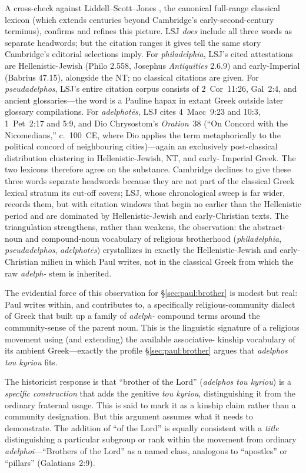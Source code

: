 \documentclass[12pt,oneside]{article}
\newcommand{\grk}[1]{\textit{#1}}   %
\begin{document}
A cross-check against Liddell--Scott--Jones \citep{LSJ1940}, the
canonical full-range classical lexicon (which extends centuries
beyond Cambridge's early-second-century terminus), confirms and
refines this picture.  LSJ \textit{does} include all three words
as separate headwords; but the citation ranges it gives tell the
same story Cambridge's editorial selections imply.  For
\grk{philadelphia}, LSJ's cited attestations are Hellenistic-Jewish
(Philo 2.558, Josephus \textit{Antiquities} 2.6.9) and early-Imperial
(Babrius 47.15), alongside the NT; no classical citations are
given.  For \grk{pseudadelphos}, LSJ's entire citation corpus
consists of 2~Cor~11:26, Gal~2:4, and ancient glossaries---the
word is a Pauline hapax in extant Greek outside later glossary
compilations.  For \grk{adelphot\=es}, LSJ cites 4~Macc~9:23 and
10:3, 1~Pet~2:17 and 5:9, and Dio Chrysostom's \textit{Oration}~38
(\enquote{On Concord with the Nicomedians,} c.~100~CE, where Dio
applies the term metaphorically to the political concord of
neighbouring cities)---again an exclusively post-classical
distribution clustering in Hellenistic-Jewish, NT, and early-
Imperial Greek.  The two lexicons therefore agree on the substance.
Cambridge declines to give these three words separate headwords
because they are not part of the classical Greek lexical stratum
its cut-off covers; LSJ, whose chronological sweep is far wider,
records them, but with citation windows that begin no earlier
than the Hellenistic period and are dominated by Hellenistic-Jewish
and early-Christian texts.  The triangulation strengthens, rather
than weakens, the observation: the abstract-noun and compound-noun
vocabulary of religious brotherhood (\grk{philadelphia},
\grk{pseudadelphos}, \grk{adelphot\=es}) crystallizes in exactly
the Hellenistic-Jewish and early-Christian milieu in which Paul
writes, not in the classical Greek from which the raw \grk{adelph-}
stem is inherited.

The evidential force of this observation for §\ref{sec:paul:brother}
is modest but real: Paul writes within, and contributes to, a
specifically religious-community dialect of Greek that built up a
family of \grk{adelph-} compound terms around the community-sense
of the parent noun.  This is the linguistic signature of a
religious movement using (and extending) the available associative-
kinship vocabulary of its ambient Greek---exactly the profile
§\ref{sec:paul:brother} argues that \grk{adelphos tou kyriou} fits.

The historicist response is that ``brother of the Lord'' (\grk{adelphos
tou kyriou}) is a \textit{specific construction} that adds the genitive
\grk{tou kyriou}, distinguishing it from the ordinary fraternal usage.
This is said to mark it as a kinship claim rather than a community
designation.  But this argument assumes what it needs to demonstrate.
The addition of ``of the Lord'' is equally consistent with a
\textit{title} distinguishing a particular subgroup or rank within the
movement from ordinary \grk{adelphoi}---``Brothers of the Lord'' as a
named class, analogous to ``apostles'' or ``pillars'' (Galatians~2:9).
\end{document}
